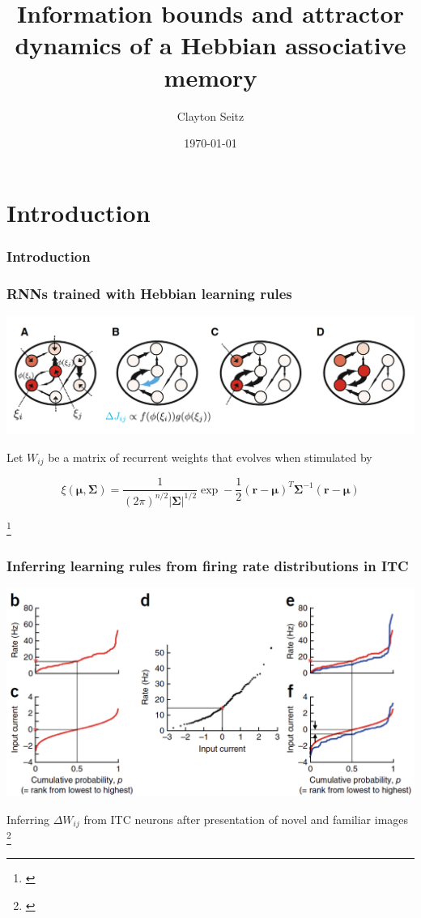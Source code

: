 \documentclass{beamer}
\begin{document}
\title{Information bounds and attractor dynamics of a Hebbian associative memory}  
\author{Clayton Seitz}
\date{\today} 

\begin{frame}[plain]
\titlepage
\end{frame}

\section{Introduction} 

\begin{frame}[plain]
\frametitle{Introduction} 

\end{frame}

\begin{frame}[plain]
\frametitle{RNNs trained with Hebbian learning rules}

\begin{center}
\includegraphics[scale=0.5]{network-diagram}
\end{center}

Let $W_{ij}$ be a matrix of recurrent weights that evolves when stimulated by 

\begin{equation*}
\xi(\bm{\mu}, \bm{\Sigma}) = \frac{1}{(2\pi)^{n/2}|\bm{\Sigma}|^{1/2}}\exp-\frac{1}{2}(\bm{r}-\bm{\mu})^{T}\bm{\Sigma}^{-1}(\bm{r}-\bm{\mu})
\end{equation*}

\footnote{\cite{peirera}}

\end{frame}
\begin{frame}[plain]
\frametitle{Inferring learning rules from firing rate distributions in ITC}

\begin{center}
\includegraphics[scale=0.5]{learning-rules}
\end{center}

Inferring $\Delta W_{ij}$ from ITC neurons after presentation of novel and familiar images
\footnote{\cite{lim}}

\end{frame}
\end{document}
